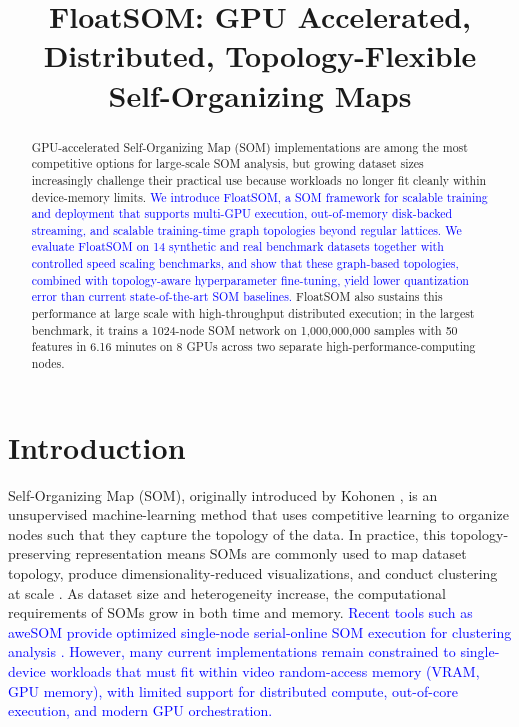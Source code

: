 \documentclass[10pt]{article} %
\title{FloatSOM: GPU Accelerated, Distributed, Topology-Flexible Self-Organizing Maps}
\author{}
\newcommand{\TrackedChange}[1]{\textcolor{blue}{#1}}
\begin{document}
\maketitle

\begin{abstract}
GPU-accelerated Self-Organizing Map (SOM) implementations are among the most competitive options for large-scale SOM analysis, but growing dataset sizes increasingly challenge their practical use because workloads no longer fit cleanly within device-memory limits. \TrackedChange{We introduce FloatSOM, a SOM framework for scalable training and deployment that supports multi-GPU execution, out-of-memory disk-backed streaming, and scalable training-time graph topologies beyond regular lattices.} \TrackedChange{We evaluate FloatSOM on 14 synthetic and real benchmark datasets together with controlled speed scaling benchmarks, and show that these graph-based topologies, combined with topology-aware hyperparameter fine-tuning, yield lower quantization error than current state-of-the-art SOM baselines.} FloatSOM also sustains this performance at large scale with high-throughput distributed execution; in the largest benchmark, it trains a 1024-node SOM network on 1,000,000,000 samples with 50 features in 6.16 minutes on 8 GPUs across two separate high-performance-computing nodes.
\end{abstract}

\section{Introduction}

Self-Organizing Map (SOM), originally introduced by Kohonen \citep{kohonenSelforganizingMap1990}, is an unsupervised machine-learning method that uses competitive learning to organize nodes such that they capture the topology of the data. In practice, this topology-preserving representation means SOMs are commonly used to map dataset topology, produce dimensionality-reduced visualizations, and conduct clustering at scale \citep{kangasVariantsSelforganizingMaps1990}. As dataset size and heterogeneity increase, the computational requirements of SOMs grow in both time and memory. \TrackedChange{Recent tools such as aweSOM provide optimized single-node serial-online SOM execution for clustering analysis \citep{haAweSOMCPUGPUaccelerated2025}.} \TrackedChange{However, many current implementations remain constrained to single-device workloads that must fit within video random-access memory (VRAM, GPU memory), with limited support for distributed compute, out-of-core execution, and modern GPU orchestration.}
\end{document}
